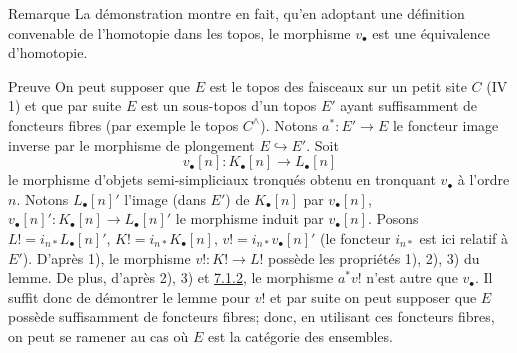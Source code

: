 \documentclass[10pt]{../fichiers-configuration-latex/smfart}
\begin{document}
\begin{enonce*}[remark]{Remarque}
La démonstration montre en fait, qu'en adoptant une définition
convenable de l'homotopie dans les topos, le morphisme $v_{∙}$ est une
équivalence d'homotopie.
\end{enonce*}

\begin{enonce*}[remark]{Preuve}
On peut supposer que $E$ est le topos des faisceaux sur un petit site
$C$ (IV 1) et que par suite $E$ est un sous-topos d'un topos $E'$
ayant suffisamment de foncteurs fibres (par exemple le topos
$C^{\wedge}$). Notons $a^\ast : E' \to E$ le foncteur
image inverse par le morphisme de plongement $E \hookrightarrow
E'$. Soit
$$
v _{∙}[n] : K _{∙}[n] \to L _{∙} [n]
$$
le morphisme d'objets semi-simpliciaux tronqués obtenu en tronquant
$v_{∙}$ à l'ordre $n$. Notons $L_{∙} [n]'$ l'image (dans $E'$)
de $K_{∙}[n]$ par $v_{∙}[n]$, $v_{∙}[n]' : K_{∙} [n] \to L_{∙}[n]'$
le morphisme induit par $v_{∙} [n]$. Posons $L! =
i_{n\ast} L_{∙}[n]'$, $K! = i_{n\ast} K_{∙}[n]$, $v! = i_{n\ast}
v_{∙}[n]'$ (le foncteur $i_{n\ast}$ est ici relatif à $E'$).
D'après 1), le morphisme $v! : K! \to L!$ possède les propriétés 1),
2), 3)  du lemme. De plus, d'après 2), 3) et \hyperref[V.prop7.1.2]{7.1.2}, le
morphisme $a^\ast v!$ n'est autre que $v_{∙}$. Il suffit donc de
démontrer le lemme pour $v!$ et par suite on peut supposer que $E$
possède suffisamment de foncteurs fibres; donc, en utilisant ces
foncteurs fibres, on peut se ramener au cas où $E$ est la
catégorie des ensembles.
\end{enonce*}

\end{document}
